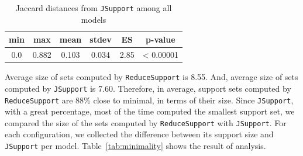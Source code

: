 \begin{table}
  \centering
  \begin{tabular}{ |c|c|c|c|c|c| }
    \hline
     min & max & mean & stdev & ES & p-value\\[0.5ex]
    \hline
     0.0   & 0.882 & 0.103 & 0.034 & 2.85 & < 0.00001 \\[0.5ex]
    \hline
  \end{tabular}
  \caption{Jaccard distances from \texttt{JSupport} among all models}
  \label{tab:jsupjac}
\end{table}

Average size of sets computed by \texttt{ReduceSupport} is 8.55. And, average size of sets computed by \texttt{JSupport} is 7.60. Therefore, in average, support sets computed by \texttt{ReduceSupport} are 88\% close to minimal, in terms of their size.  %
Since \texttt{JSupport}, with a great percentage, most of the time computed the smallest support set, we compared the size of the sets computed by \texttt{ReduceSupport} with \texttt{JSupport}. For each configuration, we collected the difference between its support size and \texttt{JSupport} per model. Table~\ref{tab:minimality} shows the result of analysis.

